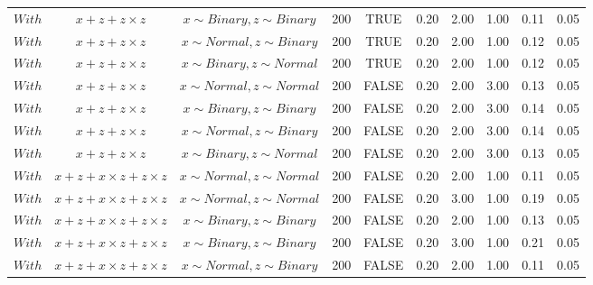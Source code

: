 \begin{longtable}{lccccccccc}
  $With$ & $\textit{x} + \textit{z} + \textit{z} \times \textit{z}$ & $\textit{x} \sim Binary, \textit{z} \sim Binary$ & 200 & TRUE & 0.20 & 2.00 & 1.00 & 0.11 & 0.05 \\ 
  $With$ & $\textit{x} + \textit{z} + \textit{z} \times \textit{z}$ & $\textit{x} \sim Normal, \textit{z} \sim Binary$ & 200 & TRUE & 0.20 & 2.00 & 1.00 & 0.12 & 0.05 \\ 
  $With$ & $\textit{x} + \textit{z} + \textit{z} \times \textit{z}$ & $\textit{x} \sim Binary, \textit{z} \sim Normal$ & 200 & TRUE & 0.20 & 2.00 & 1.00 & 0.12 & 0.05 \\ 
  $With$ & $\textit{x} + \textit{z} + \textit{z} \times \textit{z}$ & $\textit{x} \sim Normal , \textit{z} \sim Normal$ & 200 & FALSE & 0.20 & 2.00 & 3.00 & 0.13 & 0.05 \\ 
  $With$ & $\textit{x} + \textit{z} + \textit{z} \times \textit{z}$ & $\textit{x} \sim Binary, \textit{z} \sim Binary$ & 200 & FALSE & 0.20 & 2.00 & 3.00 & 0.14 & 0.05 \\ 
  $With$ & $\textit{x} + \textit{z} + \textit{z} \times \textit{z}$ & $\textit{x} \sim Normal, \textit{z} \sim Binary$ & 200 & FALSE & 0.20 & 2.00 & 3.00 & 0.14 & 0.05 \\ 
  $With$ & $\textit{x} + \textit{z} + \textit{z} \times \textit{z}$ & $\textit{x} \sim Binary, \textit{z} \sim Normal$ & 200 & FALSE & 0.20 & 2.00 & 3.00 & 0.13 & 0.05 \\ 
  $With$ & $\textit{x} + \textit{z} + \textit{x} \times \textit{z} + \textit{z} \times \textit{z}$ & $\textit{x} \sim Normal , \textit{z} \sim Normal$ & 200 & FALSE & 0.20 & 2.00 & 1.00 & 0.11 & 0.05 \\ 
  $With$ & $\textit{x} + \textit{z} + \textit{x} \times \textit{z} + \textit{z} \times \textit{z}$ & $\textit{x} \sim Normal , \textit{z} \sim Normal$ & 200 & FALSE & 0.20 & 3.00 & 1.00 & 0.19 & 0.05 \\ 
  $With$ & $\textit{x} + \textit{z} + \textit{x} \times \textit{z} + \textit{z} \times \textit{z}$ & $\textit{x} \sim Binary, \textit{z} \sim Binary$ & 200 & FALSE & 0.20 & 2.00 & 1.00 & 0.13 & 0.05 \\ 
  $With$ & $\textit{x} + \textit{z} + \textit{x} \times \textit{z} + \textit{z} \times \textit{z}$ & $\textit{x} \sim Binary, \textit{z} \sim Binary$ & 200 & FALSE & 0.20 & 3.00 & 1.00 & 0.21 & 0.05 \\ 
  $With$ & $\textit{x} + \textit{z} + \textit{x} \times \textit{z} + \textit{z} \times \textit{z}$ & $\textit{x} \sim Normal, \textit{z} \sim Binary$ & 200 & FALSE & 0.20 & 2.00 & 1.00 & 0.11 & 0.05 \\ 

\end{longtable}
